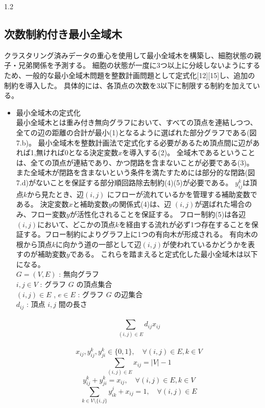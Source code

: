 \documentclass[dvipdfmx,11pt]{kuisthesis}
\begin{document}
\begin{spacing}{1.2}
\subsection{次数制約付き最小全域木}\label{subsec-abstract}
クラスタリング済みデータの重心を使用して最小全域木を構築し、細胞状態の親子・兄弟関係を予測する。
細胞の状態が一度に3つ以上に分岐しないようにするため、一般的な最小全域木問題を整数計画問題として定式化[12][15]し、追加の制約を導入した。
具体的には、各頂点の次数を3以下に制限する制約を加えている。
\begin{itemize}
  \item 最小全域木の定式化\\
  最小全域木とは重み付き無向グラフにおいて、すべての頂点を連結しつつ、全ての辺の距離の合計が最小(1)となるように選ばれた部分グラフである(図7.b)。
  最小全域木を整数計画法で定式化する必要があるため頂点間に辺があれば1,無ければ0となる決定変数$x$を導入する(2)。
  全域木であるということは、全ての頂点が連結であり、かつ閉路を含まないことが必要である(3)。
  また全域木が閉路を含まないという条件を満たすためには部分的な閉路(図7.d)がないことを保証する部分順回路除去制約(4)(5)が必要である。
  $y_{ij}^{k}$は頂点$k$から見たとき、辺$(i,j)$ にフローが流れているかを管理する補助変数である。
  決定変数$x$と補助変数$y$の関係式(4)は、辺 $(i,j)$が選ばれた場合のみ、フロー変数$y$が活性化されることを保証する。
  フロー制約(5)は各辺$(i,j)$において、どこかの頂点$k$を経由する流れが必ず1つ存在することを保証する。フロー制約によりグラフ上に1つの有向木が形成される。
  有向木の根から頂点$k$に向かう道の一部として辺$(i,j)$が使われているかどうかを表すのが補助変数$y$である。
  これらを踏まえると定式化した最小全域木は以下になる。\\
$G = (V, E)$ : 無向グラフ\\
$i, j \in V$ : グラフ $G$ の頂点集合\\
$(i, j) \in E$ , $e \in E$ : グラフ $G$ の辺集合\\
$d_{ij}$ : 頂点 ${i,j}$ 間の長さ\\
 \\
\begin{equation}
  \sum_{(i,j) \in E} d_{ij} x_{ij}
\end{equation}
\\
\begin{equation}
  x_{ij}, y_{ij}^{k}, y_{ji}^{k} \in \{0,1\}, \quad \forall (i,j) \in E, k \in V
\end{equation}
\begin{equation}
  \sum_{(i,j) \in E} x_{ij} = |V| - 1
\end{equation}
\begin{equation}
  y_{ij}^{k} + y_{ji}^{k} = x_{ij}, \quad \forall (i,j) \in E, k \in V
\end{equation}
\begin{equation}
  \sum_{k \in V \setminus \{i,j\}} y_{ik}^{j} + x_{ij} = 1, \quad \forall (i,j) \in E
\end{equation}


\end{itemize}
\end{spacing}
\end{document}
